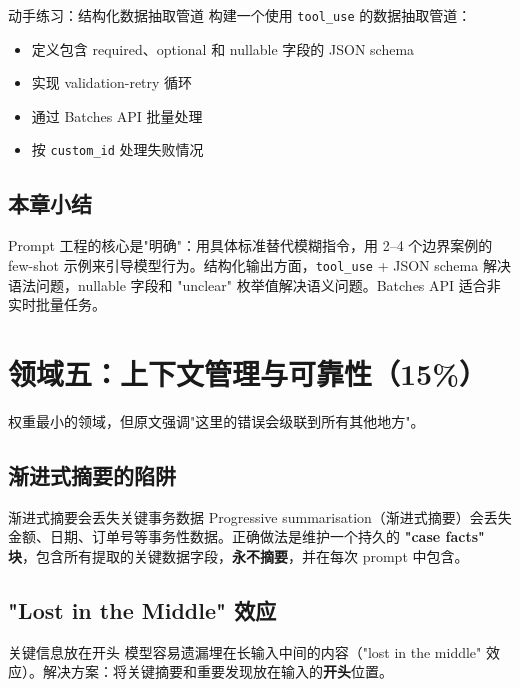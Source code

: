 \documentclass[a4paper]{article}
\begin{document}
\begin{knowledgebox}{动手练习：结构化数据抽取管道}
构建一个使用 \texttt{tool\_use} 的数据抽取管道：
\begin{itemize}[leftmargin=1.5em]
    \item 定义包含 required、optional 和 nullable 字段的 JSON schema
    \item 实现 validation-retry 循环
    \item 通过 Batches API 批量处理
    \item 按 \texttt{custom\_id} 处理失败情况
\end{itemize}
\end{knowledgebox}

\subsection{本章小结}

Prompt 工程的核心是"明确"：用具体标准替代模糊指令，用 2--4 个边界案例的 few-shot 示例来引导模型行为。结构化输出方面，\texttt{tool\_use} + JSON schema 解决语法问题，nullable 字段和 "unclear" 枚举值解决语义问题。Batches API 适合非实时批量任务。

\section{领域五：上下文管理与可靠性（15\%）}

权重最小的领域，但原文强调"这里的错误会级联到所有其他地方"。

\subsection{渐进式摘要的陷阱}

\begin{warningbox}{渐进式摘要会丢失关键事务数据}
Progressive summarisation（渐进式摘要）会丢失金额、日期、订单号等事务性数据。正确做法是维护一个持久的 \textbf{"case facts" 块}，包含所有提取的关键数据字段，\textbf{永不摘要}，并在每次 prompt 中包含。
\end{warningbox}

\subsection{"Lost in the Middle" 效应}

\begin{importantbox}{关键信息放在开头}
模型容易遗漏埋在长输入中间的内容（"lost in the middle" 效应）。解决方案：将关键摘要和重要发现放在输入的\textbf{开头}位置。
\end{importantbox}
\end{document}
